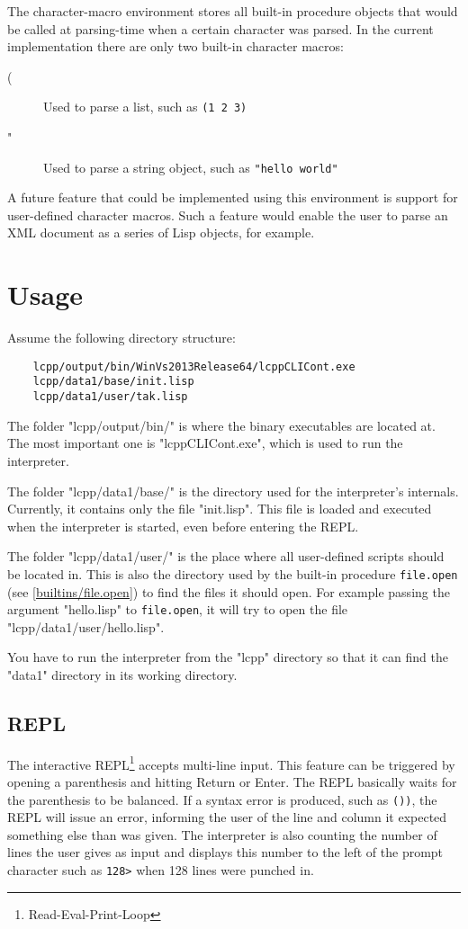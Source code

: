 \documentclass[a4paper]{scrartcl}
\newcommand{\lisp}{Lisp}
\begin{document}
	The character-macro environment stores all built-in procedure objects that would be called at parsing-time when a certain character was parsed. In the current implementation there are only two built-in character macros:
	\begin{description}
		\item[(] Used to parse a list, such as \lstinline|(1 2 3)|
		\item["] Used to parse a string object, such as \lstinline|"hello world"|
	\end{description}

	A future feature that could be implemented using this environment is support for user-defined character macros. Such a feature would enable the user to parse an XML document as a series of \lisp{} objects, for example.

\section{Usage}
\label{usage}
	Assume the following directory structure:
	\begin{lstlisting}
	lcpp/output/bin/WinVs2013Release64/lcppCLICont.exe
	lcpp/data1/base/init.lisp
	lcpp/data1/user/tak.lisp
	\end{lstlisting}

	The folder "lcpp/output/bin/" is where the binary executables are located at. The most important one is "lcppCLICont.exe", which is used to run the interpreter.

	The folder "lcpp/data1/base/" is the directory used for the interpreter's internals. Currently, it contains only the file "init.lisp". This file is loaded and executed when the interpreter is started, even before entering the REPL.

	The folder "lcpp/data1/user/" is the place where all user-defined scripts should be located in. This is also the directory used by the built-in procedure \lstinline|file.open| (see \ref{builtins/file.open}) to find the files it should open. For example passing the argument "hello.lisp" to \lstinline|file.open|, it will try to open the file "lcpp/data1/user/hello.lisp".

	You have to run the interpreter from the "lcpp" directory so that it can find the "data1" directory in its working directory.

\subsection{REPL}
\label{usage/repl}
	The interactive REPL\footnote{Read-Eval-Print-Loop} accepts multi-line input. This feature can be triggered by opening a parenthesis and hitting Return or Enter. The REPL basically waits for the parenthesis to be balanced. If a syntax error is produced, such as \lstinline|())|, the REPL will issue an error, informing the user of the line and column it expected something else than was given. The interpreter is also counting the number of lines the user gives as input and displays this number to the left of the prompt character such as \lstinline|128>| when 128 lines were punched in.
\end{document}
